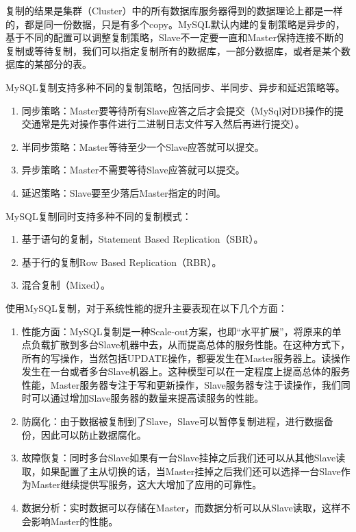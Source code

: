 复制的结果是集群（Cluster）中的所有数据库服务器得到的数据理论上都是一样的，都是同一份数据，只是有多个copy。MySQL默认内建的复制策略是异步的，基于不同的配置可以调整复制策略，Slave不一定要一直和Master保持连接不断的复制或等待复制，我们可以指定复制所有的数据库，一部分数据库，或者是某个数据库的某部分的表。

MySQL复制支持多种不同的复制策略，包括同步、半同步、异步和延迟策略等。
\begin{enumerate}
\item 同步策略：Master要等待所有Slave应答之后才会提交（MySql对DB操作的提交通常是先对操作事件进行二进制日志文件写入然后再进行提交）。
\item 半同步策略：Master等待至少一个Slave应答就可以提交。
\item 异步策略：Master不需要等待Slave应答就可以提交。
\item 延迟策略：Slave要至少落后Master指定的时间。
\end{enumerate}
MySQL复制同时支持多种不同的复制模式：
\begin{enumerate}
\item 基于语句的复制，Statement Based Replication（SBR）。
\item 基于行的复制Row Based Replication（RBR）。
\item 混合复制（Mixed）。
\end{enumerate}
使用MySQL复制，对于系统性能的提升主要表现在以下几个方面：
\begin{enumerate}
\item 性能方面：MySQL复制是一种Scale-out方案，也即“水平扩展”，将原来的单点负载扩散到多台Slave机器中去，从而提高总体的服务性能。在这种方式下，所有的写操作，当然包括UPDATE操作，都要发生在Master服务器上。读操作发生在一台或者多台Slave机器上。这种模型可以在一定程度上提高总体的服务性能，Master服务器专注于写和更新操作，Slave服务器专注于读操作，我们同时可以通过增加Slave服务器的数量来提高读服务的性能。

\item 防腐化：由于数据被复制到了Slave，Slave可以暂停复制进程，进行数据备份，因此可以防止数据腐化。

\item 故障恢复：同时多台Slave如果有一台Slave挂掉之后我们还可以从其他Slave读取，如果配置了主从切换的话，当Master挂掉之后我们还可以选择一台Slave作为Master继续提供写服务，这大大增加了应用的可靠性。

\item 数据分析：实时数据可以存储在Master，而数据分析可以从Slave读取，这样不会影响Master的性能。
\end{enumerate}

